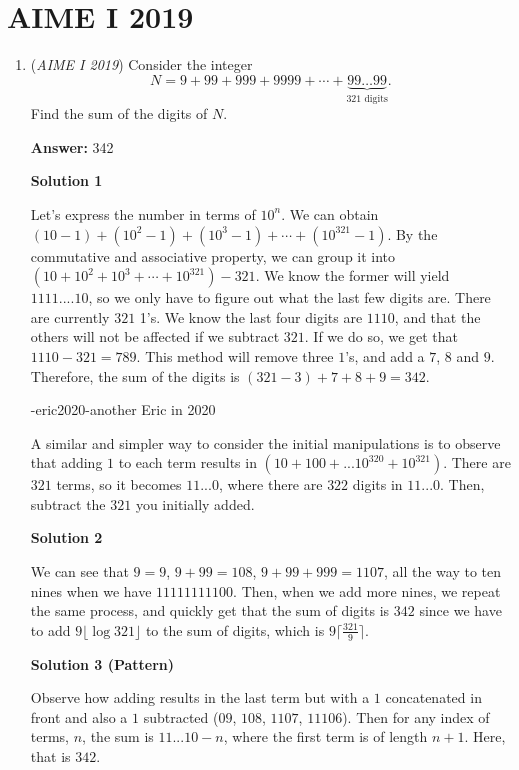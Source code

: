 \section{AIME I 2019}
        \begin{enumerate}
        	\item (\textit{AIME I 2019}) Consider the integer 
 \[N = 9 + 99 + 999 + 9999 + \cdots + \underbrace{99\ldots 99}_\text{321 digits}.\]Find the sum of the digits of $N$.


 
 \textbf{Answer: }342



\textbf{Solution 1}

Let's express the number in terms of $10^n$. We can obtain $(10-1)+(10^2-1)+(10^3-1)+\cdots+(10^{321}-1)$. By the commutative and associative property, we can group it into $(10+10^2+10^3+\cdots+10^{321})-321$. We know the former will yield $1111....10$, so we only have to figure out what the last few digits are. There are currently $321$ 1's. We know the last four digits are $1110$, and that the others will not be affected if we subtract $321$. If we do so, we get that $1110-321=789$. This method will remove three $1$'s, and add a $7$, $8$ and $9$. Therefore, the sum of the digits is $(321-3)+7+8+9=\boxed{342}$.

 -eric2020-another Eric in 2020

 


 A similar and simpler way to consider the initial manipulations is to observe that adding $1$ to each term results in $(10+100+... 10^{320}+10^{321})$. There are $321$ terms, so it becomes $11...0$, where there are $322$ digits in $11...0$. Then, subtract the $321$ you initially added. 

 



\textbf{Solution 2}

We can see that $9=9$, $9+99=108$, $9+99+999=1107$, all the way to ten nines when we have $11111111100$. Then, when we add more nines, we repeat the same process, and quickly get that the sum of digits is $\boxed{342}$ since we have to add $9\lfloor \log 321 \rfloor$ to the sum of digits, which is $9\lceil \frac{321}9 \rceil$.

 



\textbf{Solution 3 (Pattern)}

Observe how adding results in the last term but with a $1$ concatenated in front and also a $1$ subtracted ($09$, $108$, $1107$, $11106$). Then for any index of terms, $n$, the sum is $11...10-n$, where the first term is of length $n+1$. Here, that is $\boxed{342}$.


\end{enumerate}
